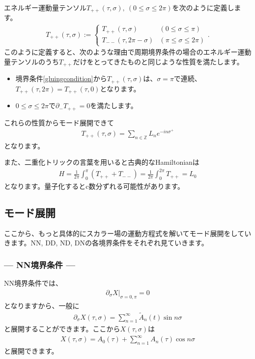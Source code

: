 \documentclass[report,paper=a4, fontsize=12pt, line_length=16cm, number_of_lines=33,dvipdfmx]{jlreq}
\numberwithin{equation}{chapter}
\numberwithin{equation}{section}
\newcommand{\Zb}{\mathbb{Z}}
\newcommand{\del}{\partial}
\newcommand{\At}{\widetilde{A}}
\begin{document}
エネルギー運動量テンソル$T_{++}(\tau,\sigma),\ (0\le \sigma \le 2\pi)$を次のように定義します。
\begin{align}
  T_{++}(\tau,\sigma):=
  \begin{cases}
    T_{++}(\tau,\sigma)& (0\le \sigma \le \pi)\\
    T_{--}(\tau,2\pi-\sigma) & (\pi\le \sigma \le 2\pi)
  \end{cases}.
\end{align}
このように定義すると、次のような理由で周期境界条件の場合のエネルギー運動量テンソルのうち$T_{++}$だけをとってきたものと同じような性質を満たします。
\begin{itemize}
  \item 境界条件\eqref{gluingcondition}から$T_{++}(\tau,\sigma)$は、$\sigma=\pi$で連続、$T_{++}(\tau,2\pi)=T_{++}(\tau,0)$となります。
  \item $0\le \sigma \le 2\pi$で$\del_{-}T_{++}=0$を満たします。
\end{itemize}
これらの性質からモード展開できて
\begin{align}
  T_{++}(\tau,\sigma)=\sum_{n\in\Zb}
  L_{n}e^{-in\sigma^{+}}
\end{align}
となります。

また、二重化トリックの言葉を用いると古典的なHamiltonianは
\begin{align}
  H=\frac{1}{2\pi}\int_{0}^{\pi}(T_{++}+T_{--})
  =\frac{1}{2\pi}\int_{0}^{2\pi}T_{++}
  =L_{0}
\end{align}
となります。量子化するとc数分ずれる可能性があります。

\subsection{モード展開}
ここから、もっと具体的にスカラー場の運動方程式を解いてモード展開をしていきます。NN, DD, ND, DNの各境界条件をそれぞれ見ていきます。
\subsubsection*{--- NN境界条件 ---}
NN境界条件では、
\begin{align}
  \del_{\sigma}X\Bigg|_{\sigma=0,\pi}=0
\end{align}
となりますから、一般に
\begin{align}
  \del_{\sigma}X(\tau,\sigma)=\sum_{n=1}^{\infty}\At_n(t)\sin n\sigma
\end{align}
と展開することができます。ここから$X(\tau,\sigma)$は
\begin{align}
  X(\tau,\sigma)=A_{0}(\tau)+\sum_{n=1}^{\infty}A_{n}(\tau)\cos n\sigma\label{NNmodes0}
\end{align}
と展開できます。
\end{document}
